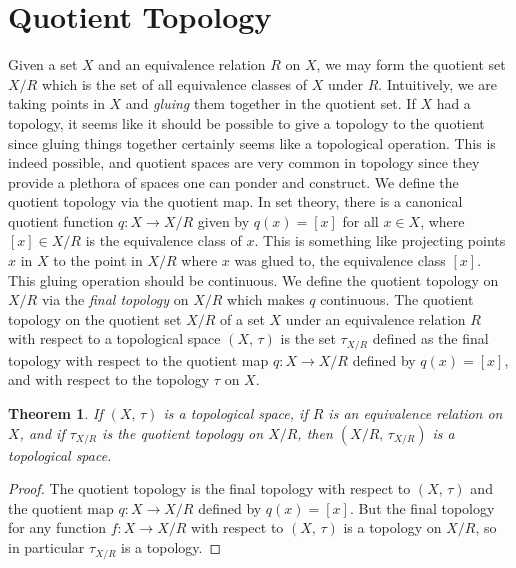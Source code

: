 \documentclass{article}
\theoremstyle{plain}
\newtheorem{theorem}{Theorem}[section]
\theoremstyle{normal}
\newenvironment{definition}{%
    \pushQED{\qed}\renewcommand{\qedsymbol}{$\blacksquare$}\definitionx%
}{%
    \popQED\enddefinitionx%
}
\begin{document}
    \section{Quotient Topology}
        Given a set $X$ and an equivalence relation $R$ on $X$, we may form
        the quotient set $X/R$ which is the set of all equivalence classes
        of $X$ under $R$. Intuitively, we are taking points in $X$ and
        \textit{gluing} them together in the quotient set. If $X$ had a
        topology, it seems like it should be possible to give a topology to
        the quotient since gluing things together certainly seems like a
        topological operation. This is indeed possible, and quotient spaces are
        very common in topology since they provide a plethora of spaces one
        can ponder and construct. We define the quotient topology via the
        quotient map. In set theory, there is a canonical quotient function
        $q:X\rightarrow{X}/R$ given by $q(x)=[x]$ for all $x\in{X}$, where
        $[x]\in{X}/R$ is the equivalence class of $x$. This is something like
        projecting points $x$ in $X$ to the point in $X/R$ where $x$ was glued
        to, the equivalence class $[x]$. This gluing operation should be
        continuous. We define the quotient topology on $X/R$ via the
        \textit{final topology} on $X/R$ which makes $q$ continuous.
        \begin{definition}[\textbf{Quotient Topology}]
            The quotient topology on the quotient set $X/R$ of a set $X$ under
            an equivalence relation $R$ with respect to a topological space
            $(X,\,\tau)$ is the set $\tau_{X/R}$ defined as the final topology
            with respect to the quotient map $q:X\rightarrow{X}/R$ defined
            by $q(x)=[x]$, and with respect to the topology $\tau$ on $X$.
        \end{definition}
        \begin{theorem}
            If $(X,\,\tau)$ is a topological space, if $R$ is an equivalence
            relation on $X$, and if $\tau_{X/R}$ is the quotient topology on
            $X/R$, then $(X/R,\,\tau_{X/R})$ is a topological space.
        \end{theorem}
        \begin{proof}
            The quotient topology is the final topology with respect to
            $(X,\,\tau)$ and the quotient map $q:X\rightarrow{X}/R$ defined by
            $q(x)=[x]$. But the final topology for any function
            $f:X\rightarrow{X}/R$ with respect to $(X,\,\tau)$ is a topology on
            $X/R$, so in particular $\tau_{X/R}$ is a topology.
        \end{proof}
\end{document}
